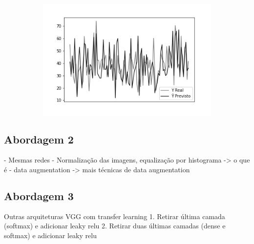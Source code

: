 \begin{figure}[hb!]
\begin{subfigure}[hb]{0.5\linewidth}
    \label{fig:redeneuralbiologica}
    \includegraphics[width=\linewidth]{img/graficos-fase2/fig-reta-dif-lenet-relu-data-augmentation-21.png}%
  \end{subfigure}%
\end{figure}

\subsection{Abordagem 2}

- Mesmas redes
- Normalização das imagens, equalização por histograma -> o que é
- data augmentation ->  mais técnicas de data augmentation

\subsection{Abordagem 3}

Outras arquiteturas
VGG
com transfer learning
1. Retirar última camada (softmax) e adicionar leaky relu
2. Retirar duas últimas camadas (dense e softmax) e adicionar leaky relu

